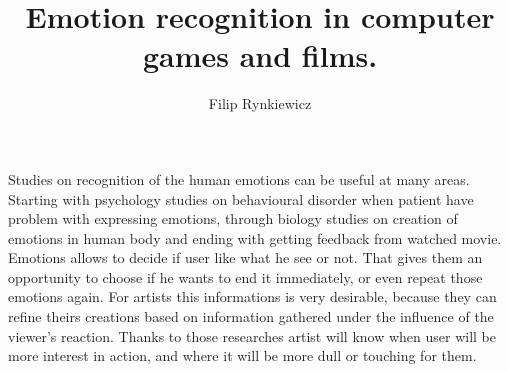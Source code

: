 \documentclass[10pt,journal,compsoc,twoside]{IEEEtran}
\begin{document}
\title{Emotion recognition in computer games and films.}

\author{Filip Rynkiewicz%
}


%
{}


\maketitle
\IEEEdisplaynontitleabstractindextext
\IEEEpeerreviewmaketitle
{}
Studies on recognition of the human emotions can be useful at many areas. Starting with psychology studies on behavioural disorder when patient have problem with expressing emotions, through biology studies on creation of emotions in human body and ending with getting feedback from watched movie. Emotions allows to decide if user like what he see or not. That gives them an opportunity to choose if he wants to end it immediately, or even repeat those emotions again. For artists this informations is very desirable, because they can refine theirs creations based on information gathered under the influence of the viewer's reaction. Thanks to those researches artist will know when user will be more interest in action, and where it will be more dull or touching for them. 
\end{document}
